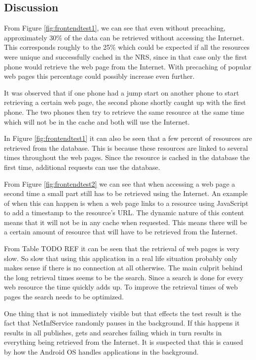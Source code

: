 \subsection{Discussion}

From Figure \ref{fig:frontendtest1}, we can see that even without precaching, approximately 30\% of the data can be retrieved without accessing the Internet. This corresponds roughly to the 25\% which could be expected if all the resources were unique and successfully cached in the NRS, since in that case only the first phone would retrieve the web page from the Internet. With precaching of popular web pages this percentage could possibly increase even further.

It was observed that if one phone had a jump start on another phone to start retrieving a certain web page, the second phone shortly caught up with the first phone. The two phones then try to retrieve the same resource at the same time which will not be in the cache and both will use the Internet.

In Figure \ref{fig:frontendtest1} it can also be seen that a few percent of resources are retrieved from the database. This is because these resources are linked to several times throughout the web pages. Since the resource is cached in the database the first time, additional requests can use the database.

From Figure \ref{fig:frontendtest2} we can see that when accessing a web page a second time a small part still has to be retrieved using the Internet. An example of when this can happen is when a web page links to a resource using JavaScript to add a timestamp to the resource's URL. The dynamic nature of this content means that it will not be in any cache when requested. This means there will be a certain amount of resource that will have to be retrieved from the Internet.

From Table TODO REF it can be seen that the retrieval of web pages is very slow. So slow that using this application in a real life situation probably only makes sense if there is no connection at all otherwise. The main culprit behind the long retrieval times seems to be the search. Since a search is done for every web resource the time quickly adds up. To improve the retrieval times of web pages the search needs to be optimized.

One thing that is not immediately visible but that effects the test result is the fact that NetInfService randomly pauses in the background. If this happens it results in all publishes, gets and searches failing which in turn results in everything being retrieved from the Internet. It is suspected that this is caused by how the Android OS handles applications in the background.